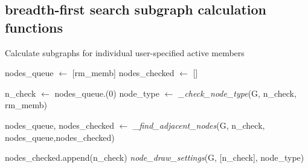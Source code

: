 \subsection{breadth-first search subgraph calculation functions} \label{sec:appendixa_1}
    \begin{algorithm*}
        \scriptsize
        \caption*{Calculate subgraphs for individual user-specified active members}
        \label{alg:bld_subg_single_remove}
        
        \begin{algorithmic}[1]
            \State nodes\_queue $\gets$ [rm\_memb]
            \State nodes\_checked $\gets$ []
    
            \State
            
                \State n\_check $\gets$ nodes\_queue.(0)
                \State node\_type $\gets$ \textit{\_check\_node\_type}(G, n\_check, rm\_memb)
        
                    \State nodes\_queue, nodes\_checked $\gets$ \textit{\_find\_adjacent\_nodes}(G, n\_check, nodes\_queue,nodes\_checked)
                \EndIf
                
                \State nodes\_checked.append(n\_check)
                \State \textit{node\_draw\_settings}(G, [n\_check], node\_type)
            \EndWhile


\end{algorithmic}
\end{algorithm*}
